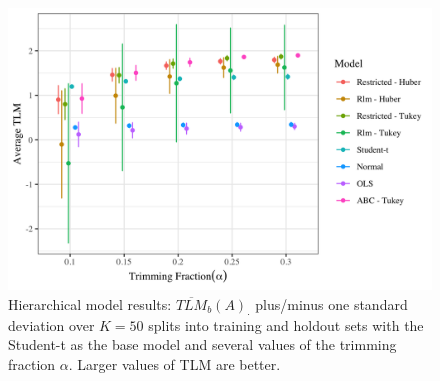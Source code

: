 \documentclass[ba]{imsart}
\begin{document}
\begin{figure}[t]
\centering
\includegraphics[width=6in]{hier_average_tlm.png}
\caption{Hierarchical model results: $\overline{TLM}_b(A)_{\cdot}$  plus/minus one standard deviation over $K = 50$ splits into training and holdout sets with the Student-t as the base model and several values of the trimming fraction $\alpha$. Larger values of TLM are better.}
\label{fig:hierTLM}
\end{figure}

\end{document}
